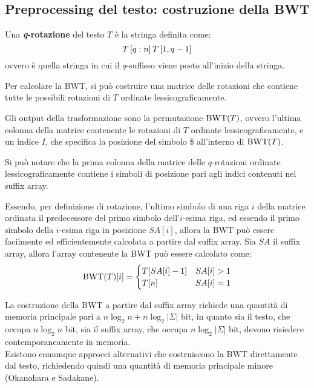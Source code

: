 \subsection*{Preprocessing del testo: costruzione della BWT}
\begin{defn}
    Una \textbf{\textit{q}-rotazione} del testo $T$ è la stringa definita come:
    \[
        T\left[q:n\right]T\left[1, q-1\right]
    \]
    ovvero è quella stringa in cui il $q$-suffisso viene posto all'inizio della
    stringa.
\end{defn}
Per calcolare la BWT, si può costruire una matrice delle rotazioni che contiene
tutte le possibili rotazioni di $T$ ordinate lessicograficamente.
\begin{defn}
    Gli output della trasformazione sono la permutazione $\textnormal{BWT}(T)$, ovvero
    l'ultima colonna della matrice contenente le rotazioni di $T$ ordinate
    lessicograficamente, e un indice $I$, che specifica la posizione del simbolo
    \$ all'interno di $\textnormal{BWT}(T)$.
\end{defn}
\begin{rem}
    Si può notare che la prima colonna della matrice delle $q$-rotazioni
    ordinate lessicograficamente contiene i simboli di posizione pari agli
    indici contenuti nel suffix array.
\end{rem}
Essendo, per definizione di rotazione, l'ultimo simbolo di una riga $i$ della
matrice ordinata il predecessore del primo simbolo dell'$i$-esima riga, ed
essendo il primo simbolo della $i$-esima riga in posizione $SA[i]$, allora la
BWT può essere facilmente ed efficientemente calcolata a partire dal suffix
array. Sia $SA$ il suffix array, allora l'array contenente la BWT può essere
calcolato come:
\[
    \textnormal{BWT}(T)[i] = \begin{cases}
        T[SA[i]-1] & SA[i] > 1 \\
        T[n] & SA[i] = 1
    \end{cases}
\]

\begin{rem}
    La costruzione della BWT a partire dal suffix array richiede una quantità
    di memoria principale pari a $n\log_2 n + n\log_2 |\Sigma|$ bit,
    in quanto sia il testo, che occupa $n\log_2 n$ bit, sia il suffix array,
    che occupa $n\log_2 |\Sigma|$ bit, devono risiedere contemporaneamente in
    memoria.\\
    Esistono comunque approcci alternativi che costruiscono la BWT direttamente
    dal testo, richiedendo quindi una quantità di memoria principale minore
    (Okanohara e Sadakane).
\end{rem}

